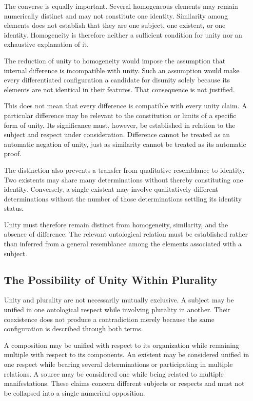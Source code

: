 The converse is equally important. Several
homogeneous elements may remain numerically
distinct and may not constitute one identity.
Similarity among elements does not establish
that they are one subject, one existent,
or one identity. Homogeneity is therefore
neither a sufficient condition for unity
nor an exhaustive explanation of it.

The reduction of unity to homogeneity would
impose the assumption that internal difference
is incompatible with unity. Such an assumption
would make every differentiated configuration
a candidate for disunity solely because
its elements are not identical in their
features. That consequence is not justified.

This does not mean that every difference
is compatible with every unity claim.
A particular difference may be relevant
to the constitution or limits of a specific
form of unity. Its significance must,
however, be established in relation to
the subject and respect under consideration.
Difference cannot be treated as an automatic
negation of unity, just as similarity cannot
be treated as its automatic proof.

The distinction also prevents a transfer
from qualitative resemblance to identity.
Two existents may share many determinations
without thereby constituting one identity.
Conversely, a single existent may involve
qualitatively different determinations
without the number of those determinations
settling its identity status.

Unity must therefore remain distinct from
homogeneity, similarity, and the absence
of difference. The relevant ontological
relation must be established rather than
inferred from a general resemblance among
the elements associated with a subject.

\subsection{The Possibility of Unity Within Plurality}

Unity and plurality are not necessarily
mutually exclusive. A subject may be unified
in one ontological respect while involving
plurality in another. Their coexistence
does not produce a contradiction merely
because the same configuration is described
through both terms.

A composition may be unified with respect
to its organization while remaining multiple
with respect to its components. An existent
may be considered unified in one respect
while bearing several determinations or
participating in multiple relations. A source
may be considered one while being related
to multiple manifestations. These claims
concern different subjects or respects and
must not be collapsed into a single numerical
opposition.


